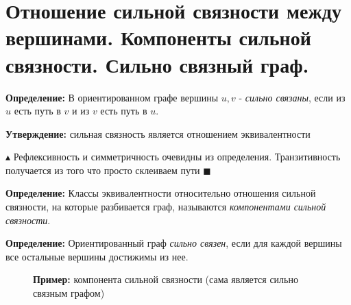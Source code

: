 \section{Отношение сильной связности между вершинами. Компоненты сильной связности. Сильно связный граф.}
\par \textbf{Определение:} В ориентированном графе вершины $u,v$ - \textit{сильно связаны}, если из $u$ есть путь в $v$ и из $v$ есть путь в $u$.
\par \textbf{Утверждение:} сильная связность является отношением эквивалентности
\par $\blacktriangle$ Рефлексивность и симметричность очевидны из определения. Транзитивность получается из того что просто склеиваем пути $\blacksquare$
\par \textbf{Определение:} Классы эквивалентности относительно отношения сильной связности, на которые разбивается граф, называются \textit{компонентами сильной связности}.
 \par \textbf{Определение:} Ориентированный граф \textit{сильно связен}, если для каждой вершины все остальные вершины достижимы из нее.
 \begin{figure}[h]
\hspace{-4ex} \begin{minipage}[h]{0.3\linewidth}
\end{minipage}
\hfill
\hspace{-4ex} \begin{minipage}[h]{0.7\linewidth}
 \par \textbf{Пример:} компонента сильной связности (сама является сильно связным графом)
\end{minipage}
\end{figure}

\setcounter{section}{30}

